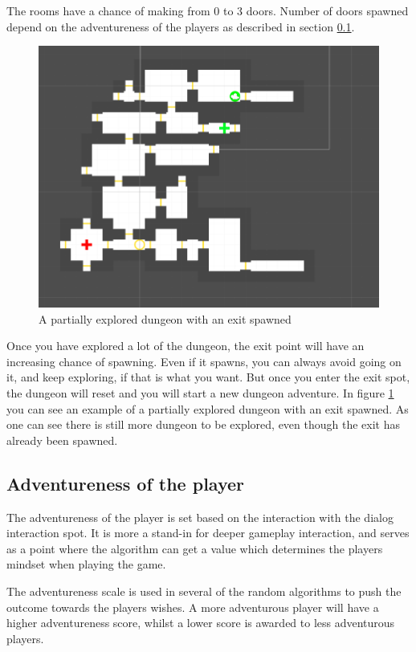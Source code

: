\documentclass[conference,compsoc]{IEEEtran}
\begin{document}
The rooms have a chance of making from 0 to 3 doors. Number of doors spawned depend on the adventureness of the players as described in section \ref{sec:adven}.

\begin{figure}[h]
	\graphicspath{{figures/}}
	\includegraphics[width = \columnwidth ]{DungeonLayout.png}
	\caption{A partially explored dungeon with an exit spawned}
	\label{fig:dungparexit}
\end{figure}
Once you have explored a lot of the dungeon, the exit point will have an increasing chance of spawning. Even if it spawns, you can always avoid going on it, and keep exploring, if that is what you want. But once you enter the exit spot, the dungeon will reset and you will start a new dungeon adventure.
In figure \ref{fig:dungparexit} you can see an example of a partially explored dungeon with an exit spawned. As one can see there is still more dungeon to be explored, even though the exit has already been spawned.

\subsection{Adventureness of the player}
\label{sec:adven}
The adventureness of the player is set based on the interaction with the dialog interaction spot. It is more a stand-in for deeper gameplay interaction, and serves as a point where the algorithm can get a value which determines the players mindset when playing the game. 

The adventureness scale is used in several of the random algorithms to push the outcome towards the players wishes. A more adventurous player will have a higher adventureness score, whilst a lower score is awarded to less adventurous players.
\end{document}
